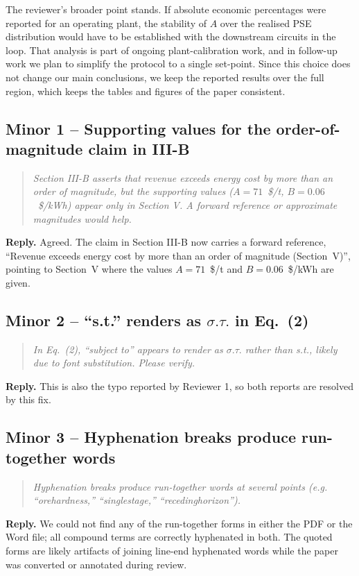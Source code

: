 \documentclass[11pt]{article}
\newenvironment{reviewquote}%
  {\begin{quote}\itshape}%
  {\end{quote}}
\begin{document}
The reviewer's broader point stands. If absolute economic percentages
were reported for an operating plant, the stability of $A$ over the
realised PSE distribution would have to be established with the
downstream circuits in the loop. That analysis is part of ongoing
plant-calibration work, and in follow-up work we plan to simplify the
protocol to a single set-point. Since this choice does not change our
main conclusions, we keep the reported results over the full region,
which keeps the tables and figures of the paper consistent.

\subsection*{Minor 1 -- Supporting values for the order-of-magnitude claim in III-B}

\begin{reviewquote}
Section III-B asserts that revenue exceeds energy cost by more than an
order of magnitude, but the supporting values ($A=71$~\$/t,
$B=0.06$~\$/kWh) appear only in Section V. A forward reference or
approximate magnitudes would help.
\end{reviewquote}

\textbf{Reply.} Agreed. The claim in Section III-B now carries a
forward reference, ``Revenue exceeds energy cost by more than an order
of magnitude (Section~V)'', pointing to Section~V where the values
$A=71$~\$/t and $B=0.06$~\$/kWh are given.

\subsection*{Minor 2 -- ``s.t.'' renders as $\sigma.\tau.$ in Eq.~(2)}

\begin{reviewquote}
In Eq.~(2), ``subject to'' appears to render as $\sigma.\tau.$ rather
than s.t., likely due to font substitution. Please verify.
\end{reviewquote}

\textbf{Reply.} This is also the typo reported by Reviewer 1, so both
reports are resolved by this fix.

\subsection*{Minor 3 -- Hyphenation breaks produce run-together words}

\begin{reviewquote}
Hyphenation breaks produce run-together words at several points (e.g.
``orehardness,'' ``singlestage,'' ``recedinghorizon'').
\end{reviewquote}

\textbf{Reply.} We could not find any of the run-together forms in
either the PDF or the Word file; all compound terms are correctly
hyphenated in both. The quoted forms are likely artifacts of joining
line-end hyphenated words while the paper was converted or annotated
during review.
\end{document}
